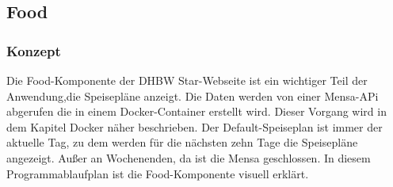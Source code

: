 \subsection{Food}
\subsubsection{Konzept}
Die Food-Komponente der DHBW Star-Webseite ist ein wichtiger Teil der Anwendung,die Speisepläne anzeigt.
Die Daten werden von einer Mensa-APi abgerufen die in einem Docker-Container erstellt wird. Dieser Vorgang wird in dem Kapitel Docker näher beschrieben.
Der Default-Speiseplan ist immer der aktuelle Tag, zu dem werden für die nächsten zehn Tage die Speisepläne angezeigt. Außer an Wochenenden, da ist die Mensa geschlossen.
In diesem Programmablaufplan ist die Food-Komponente visuell erklärt.\\
